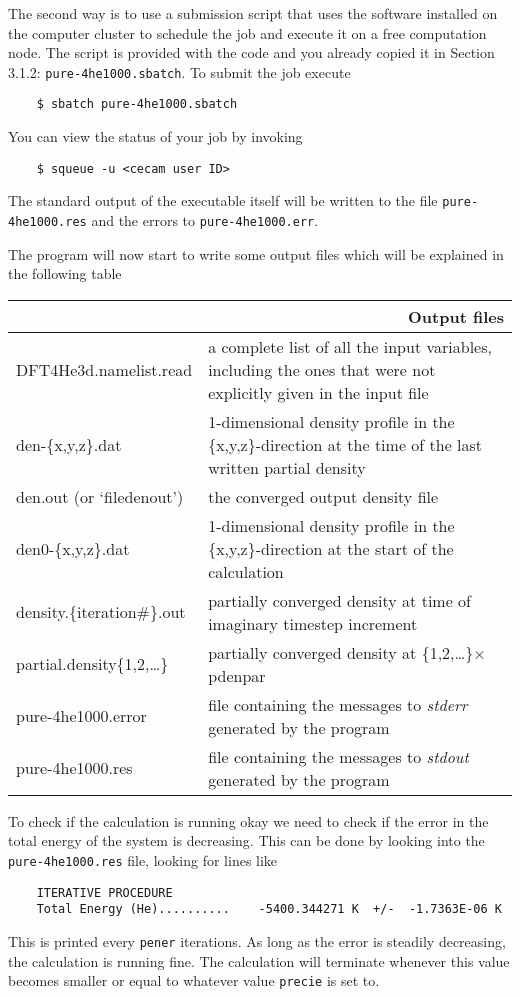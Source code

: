 \documentclass[10pt,a4paper]{article}
\begin{document}
	The second way is to use a submission script that uses the software installed on the computer cluster to schedule the job and execute it on a free computation node. The script is provided with the code and you already copied it in Section 3.1.2: \verb|pure-4he1000.sbatch|. To submit the job execute
	\begin{verbatim}
	$ sbatch pure-4he1000.sbatch
	\end{verbatim}
	You can view the status of your job by invoking
	\begin{verbatim}
	$ squeue -u <cecam user ID>
	\end{verbatim}
	The standard output of the executable itself will be written to the file \newline \verb|pure-4he1000.res| and the errors to \verb|pure-4he1000.err|.
	
	The program will now start to write some output files which will be explained in the following table
	\begin{center}
		\begin{tabular}{l|p{7.5cm}}
			\multicolumn{2}{r}{\textbf{Output files}} \\
			\hline\hline
			DFT4He3d.namelist.read			& a complete list of all the input variables, including the ones that were not explicitly given in the input file \\
			\hline
			den-\{x,y,z\}.dat				& 1-dimensional density profile in the \{x,y,z\}-direction at the time of the last written partial density \\
			\hline
			den.out	(or `filedenout')						& the converged output density file \\
			\hline
			den0-\{x,y,z\}.dat				& 1-dimensional density profile in the \{x,y,z\}-direction at the start of the calculation \\
			\hline
			density.\{iteration\#\}.out	& partially converged density at time of imaginary timestep increment \\
			\hline
			partial.density\{1,2,\ldots\}	& partially converged density at \{1,2,\ldots\}$\times$pdenpar \\
			\hline
			pure-4he1000.error				& file containing the messages to \emph{stderr} generated by the program \\
			\hline
			pure-4he1000.res				& file containing the messages to \emph{stdout} generated by the program
		\end{tabular}
	\end{center}
	
	To check if  the calculation is running okay we need to check if the error in the total energy of the system is decreasing. This can be done by looking into the \verb|pure-4he1000.res| file, looking for lines like
	\begin{verbatim}
	ITERATIVE PROCEDURE 
	Total Energy (He)..........    -5400.344271 K  +/-  -1.7363E-06 K
	\end{verbatim}
	This is printed every \verb|pener| iterations. As long as the error is steadily decreasing, the calculation is running fine. The calculation will terminate whenever this value becomes smaller or equal to whatever value \verb|precie| is set to.
	
\end{document}

